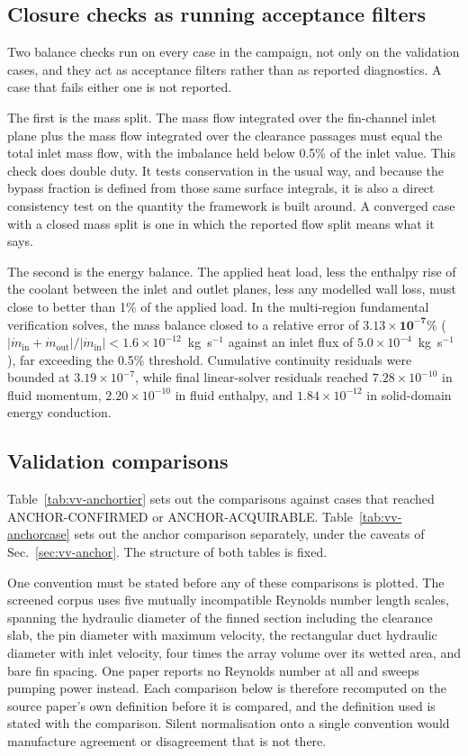 \subsection{Closure checks as running acceptance filters}
\label{sec:vv-closure}

Two balance checks run on every case in the campaign, not only on the validation cases, and they act
as acceptance filters rather than as reported diagnostics. A case that fails either one is not
reported.

The first is the mass split. The mass flow integrated over the fin-channel inlet plane plus the mass
flow integrated over the clearance passages must equal the total inlet mass flow, with the imbalance
held below 0.5\% of the inlet value. This check does double duty. It tests conservation in the usual
way, and because the bypass fraction is defined from those same surface integrals, it is also a
direct consistency test on the quantity the framework is built around. A converged case with a
closed mass split is one in which the reported flow split means what it says.

The second is the energy balance. The applied heat load, less the enthalpy rise of the coolant
between the inlet and outlet planes, less any modelled wall loss, must close to better than 1\% of
the applied load. In the multi-region fundamental verification solves, the mass balance closed to a relative error of
$\mathbf{3.13 \times 10^{-7}\%}$ ($|\dot{m}_{\mathrm{in}} + \dot{m}_{\mathrm{out}}| / |\dot{m}_{\mathrm{in}}| < 1.6 \times 10^{-12}$~kg~s$^{-1}$ against an inlet flux of $5.0 \times 10^{-4}$~kg~s$^{-1}$), far exceeding the 0.5\% threshold. Cumulative continuity residuals were bounded at $3.19 \times 10^{-7}$, while final linear-solver residuals reached $7.28 \times 10^{-10}$ in fluid momentum, $2.20 \times 10^{-10}$ in fluid enthalpy, and $1.84 \times 10^{-12}$ in solid-domain energy conduction.

\subsection{Validation comparisons}
\label{sec:vv-tables}

Table~\ref{tab:vv-anchortier} sets out the comparisons against cases that reached ANCHOR-CONFIRMED
or ANCHOR-ACQUIRABLE. Table~\ref{tab:vv-anchorcase} sets out the anchor comparison separately,
under the caveats of Sec.~\ref{sec:vv-anchor}. The structure of both tables is fixed.

One convention must be stated before any of these comparisons is plotted. The screened corpus uses
five mutually incompatible Reynolds number length scales, spanning the hydraulic diameter of the
finned section including the clearance slab, the pin diameter with maximum velocity, the
rectangular duct hydraulic diameter with inlet velocity, four times the array volume over its
wetted area, and bare fin spacing. One paper reports no Reynolds number at all and sweeps pumping
power instead. Each comparison below is therefore recomputed on the source paper's own definition
before it is compared, and the definition used is stated with the comparison. Silent normalisation
onto a single convention would manufacture agreement or disagreement that is not there.

